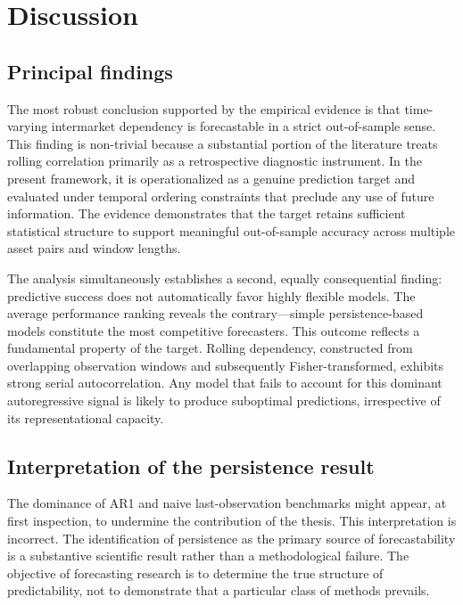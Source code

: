 \section{Discussion}

\subsection{Principal findings}

The most robust conclusion supported by the empirical evidence is that time-varying intermarket dependency is forecastable in a strict out-of-sample sense. This finding is non-trivial because a substantial portion of the literature treats rolling correlation primarily as a retrospective diagnostic instrument. In the present framework, it is operationalized as a genuine prediction target and evaluated under temporal ordering constraints that preclude any use of future information. The evidence demonstrates that the target retains sufficient statistical structure to support meaningful out-of-sample accuracy across multiple asset pairs and window lengths.

The analysis simultaneously establishes a second, equally consequential finding: predictive success does not automatically favor highly flexible models. The average performance ranking reveals the contrary---simple persistence-based models constitute the most competitive forecasters. This outcome reflects a fundamental property of the target. Rolling dependency, constructed from overlapping observation windows and subsequently Fisher-transformed, exhibits strong serial autocorrelation. Any model that fails to account for this dominant autoregressive signal is likely to produce suboptimal predictions, irrespective of its representational capacity.

\subsection{Interpretation of the persistence result}

The dominance of AR1 and naive last-observation benchmarks might appear, at first inspection, to undermine the contribution of the thesis. This interpretation is incorrect. The identification of persistence as the primary source of forecastability is a substantive scientific result rather than a methodological failure. The objective of forecasting research is to determine the true structure of predictability, not to demonstrate that a particular class of methods prevails.

